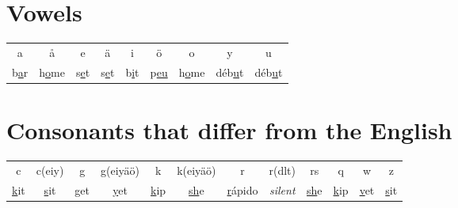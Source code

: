 \section*{Vowels}

\begin{tabular}{ccccccccc}
a & \aa & e & \"a & i & \"o & o & y & u \\
b\underline{a}r & h\underline{o}me & s\underline{e}t & s\underline{e}t & b\underline{i}t & p\underline{eu} & h\underline{o}me & d\'eb\underline{u}t & d\'eb\underline{u}t \\
\end{tabular}


\section*{Consonants that differ from the English}

\begin{tabular}{cccccccccccc}
c & c(eiy) & g & g(eiy\"a\"o) & k & k(eiy\"a\"o) & r & r(dlt) & rs & q & w & z \\
\underline{k}it & \underline{s}it & \underline{g}et & \underline{y}et & \underline{k}ip & \underline{sh}e & \underline{r}\'apido & \textit{silent} & \underline{sh}e & \underline{k}ip & \underline{v}et & \underline{s}it \\
\end{tabular}
